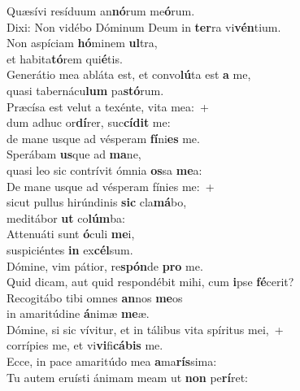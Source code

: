 \evenverse Quæsívi resíduum an\textbf{nó}rum me\textbf{ó}rum.~\*\\
\evenverse Dixi: Non vidébo Dóminum Deum in \textbf{ter}ra vi\textbf{vén}tium.\\
\oddverse Non aspíciam \textbf{hó}minem \textbf{ul}tra,~\*\\
\oddverse et habita\textbf{tó}rem qui\textbf{é}tis.\\
\evenverse Generátio mea abláta est, et convo\textbf{lú}ta est \textbf{a} me,~\*\\
\evenverse quasi tabernácu\textbf{lum} pa\textbf{stó}rum.\\
\oddverse Præcísa est velut a texénte, vita mea:~+\\
\oddverse  dum adhuc or\textbf{dí}rer, suc\textbf{cí}\textbf{dit} me:~\*\\
\oddverse de mane usque ad vésperam \textbf{fí}ni\textbf{es} me.\\
\evenverse Sperábam \textbf{us}que ad \textbf{ma}ne,~\*\\
\evenverse quasi leo sic contrívit ómnia \textbf{os}sa \textbf{me}a:\\
\oddverse De mane usque ad vésperam fínies me:~+\\
\oddverse  sicut pullus hirúndinis \textbf{sic} cla\textbf{má}bo,~\*\\
\oddverse meditábor \textbf{ut} co\textbf{lúm}ba:\\
\evenverse Attenuáti sunt \textbf{ó}culi \textbf{me}i,~\*\\
\evenverse suspiciéntes \textbf{in} ex\textbf{cél}sum.\\
\oddverse Dómine, vim pátior, re\textbf{spón}de \textbf{pro} me.~\*\\
\oddverse Quid dicam, aut quid respondébit mihi, cum \textbf{i}pse \textbf{fé}cerit?\\
\evenverse Recogitábo tibi omnes \textbf{an}nos \textbf{me}os~\*\\
\evenverse in amaritúdine \textbf{á}nimæ \textbf{me}æ.\\
\oddverse Dómine, si sic vívitur, et in tálibus vita spíritus mei,~+\\
\oddverse  corrípies me, et vi\textbf{vi}fi\textbf{cá}\textbf{bis} me.~\*\\
\oddverse Ecce, in pace amaritúdo mea \textbf{a}ma\textbf{rís}sima:\\
\evenverse Tu autem eruísti ánimam meam ut \textbf{non} pe\textbf{rí}ret:~\*\\

